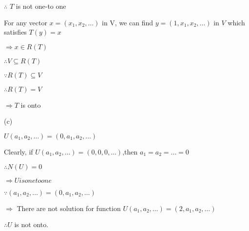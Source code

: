 \documentclass
[answers]
{exam}
\begin{document}
\begin{questions}
\begin{solution}
$\therefore$ $T$ is not one-to one

For any vector $x=(x_1,x_2,\ldots)$ in V, we can find $y=(1,x_1,x_2,\ldots)$ in $V$ which satisfies $T(y)=x$

$\Rightarrow x\in R(T)$

$\therefore V \subseteq R(T)$

$\because R(T)\subseteq V$

$\therefore R(T)=V$

$\Rightarrow T$ is onto

(c)

$U(a_1,a_2,\ldots)=(0,a_1,a_2,\ldots)$

Clearly, if $U(a_1,a_2,\ldots)=(0,0,0,\ldots)$,then $a_1=a_2=\ldots=0$

$\therefore N(U)={0}$

$\Rightarrow U is one to one$

$\because(a_1,a_2,\ldots)=(0,a_1,a_2,\ldots)$

$\Rightarrow$ There are not solution for function $U(a_1,a_2,\ldots)=(2,a_1,a_2,\ldots)$

$\therefore U$ is not onto.



\end{solution}
\end{questions}
\end{document}
